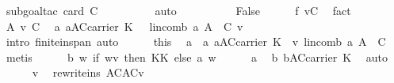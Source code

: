 \begin{isabellebody}
\ {\isacharparenleft}subgoal{\isacharunderscore}tac\ {\isachardoublequoteopen}card\ C{\isacharprime}\ {\isachargreater}{}{\isachardoublequoteclose}{\isacharparenright}\isanewline
\ \ \ \ \ \ \ \isamarkupfalse%
\ auto\isanewline
\ \ \isamarkupfalse%
\ \isanewline
\ \ \ \ \isamarkupfalse%
\ False\isanewline
\ \ \ \ \isamarkupfalse%
\ f{\isacharcolon}\ {\isachardoublequoteopen}v{\isasymnotin}C{\isacharprime}{\isachardoublequoteclose}\ \isamarkupfalse%
\ fact\isanewline
\ \ \ \ \isamarkupfalse%
\ A\ v\ C{\isacharprime}\ \isamarkupfalse%
\ {\isachardoublequoteopen}{\isasymexists}a{\isachardot}\ a{\isasymin}{\isacharparenleft}{\isacharquery}A{\isacharprime}{\isasymunion}C{\isacharprime}{\isacharparenright}{\isasymrightarrow}carrier\ K\ {\isasymand}\ \ lincomb\ a\ {\isacharparenleft}{\isacharquery}A{\isacharprime}\ {\isasymunion}\ C{\isacharprime}{\isacharparenright}\ {\isacharequal}v{\isachardoublequoteclose}\ \isanewline
\ \ \ \ \ \ \isamarkupfalse%
\ {\isacharparenleft}intro\ finite{\isacharunderscore}in{\isacharunderscore}span{\isacharcomma}\ auto{\isacharparenright}\isanewline
\ \ \ \ \isamarkupfalse%
\ this\ \isamarkupfalse%
\ a\ \ a{\isacharcolon}\ {\isachardoublequoteopen}a{\isasymin}{\isacharparenleft}{\isacharquery}A{\isacharprime}{\isasymunion}C{\isacharprime}{\isacharparenright}{\isasymrightarrow}carrier\ K\ {\isasymand}\ v{\isacharequal}\ lincomb\ a\ {\isacharparenleft}{\isacharquery}A{\isacharprime}\ {\isasymunion}\ C{\isacharprime}{\isacharparenright}{\isachardoublequoteclose}\ \isamarkupfalse%
\ metis\isanewline
\ \ \ \ \isamarkupfalse%
\ {\isacharquery}b{\isacharequal}{\isachardoublequoteopen}{\isacharparenleft}{\isasymlambda}\ w{\isachardot}\ if\ {\isacharparenleft}w{\isacharequal}v{\isacharparenright}\ then\ {\isasymominus}\isactrlbsub K\isactrlesub {\isasymone}\isactrlbsub K\isactrlesub \ else\ a\ w{\isacharparenright}{\isachardoublequoteclose}\isanewline
\ \ \ \ \isamarkupfalse%
\ a\ \isamarkupfalse%
\ b{\isacharcolon}\ {\isachardoublequoteopen}{\isacharquery}b{\isasymin}A{\isasymunion}C{\isacharprime}{\isasymrightarrow}carrier\ K{\isachardoublequoteclose}\ \isamarkupfalse%
\ auto\isanewline
\ \ \ \ \isamarkupfalse%
\ v\ \isamarkupfalse%
\ rewrite{\isacharunderscore}ins{\isacharcolon}\ {\isachardoublequoteopen}A{\isasymunion}C{\isacharprime}{\isacharequal}{\isacharparenleft}{\isacharquery}A{\isacharprime}{\isasymunion}C{\isacharprime}{\isacharparenright}{\isasymunion}{\isacharbraceleft}v{\isacharbraceright}{\isachardoublequoteclose}\ \isamarkupfalse%

\end{isabellebody}
